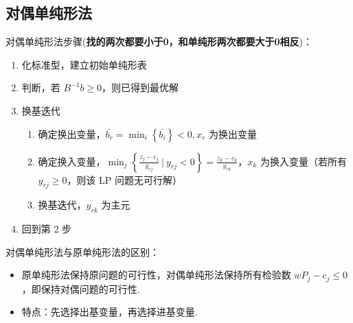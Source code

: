 \subsection{对偶单纯形法}
\begin{note}
    对偶单纯形法步骤(\textbf{找的两次都要小于0，和单纯形两次都要大于0相反})：
    \begin{enumerate}
        \item 化标准型，建立初始单纯形表
        \item 判断，若 $B^{-1}b \ge 0$，则已得到最优解
        \item 换基迭代 \begin{enumerate}
            \item 确定换出变量，$\bar{b_r} = \min_i\left\{\bar{b_i}\right\} < 0, x_r$ 为换出变量
            \item 确定换入变量，$\min_{j}\left\{\frac{z_j - c_j}{y_{rj}}\ |\ y_{rj} < 0\right\} = \frac{z_k - c_k}{y_{rk}}$，$x_k$ 为换入变量（若所有 $y_{rj} \ge 0$，则该 LP 问题无可行解）
            \item 换基迭代，$y_{rk}$ 为主元
        \end{enumerate}
        \item 回到第 2 步
    \end{enumerate}
\end{note}

\begin{note}
    对偶单纯形法与原单纯形法的区别：
    \begin{itemize}
        \item 原单纯形法保持原问题的可行性，对偶单纯形法保持所有检验数 $wP_j - c_j \le 0$，即保持对偶问题的可行性.
        \item 特点：先选择出基变量，再选择进基变量.
    \end{itemize}
\end{note}

